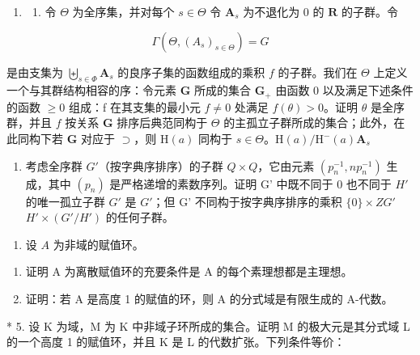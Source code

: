 \begin{enumerate}
\def\labelenumi{\arabic{enumi}.}
\setcounter{enumi}{2}
\tightlist
\item
  \begin{enumerate}
  \def\labelenumii{(\alph{enumii})}
  \tightlist
  \item
    令 \(\Theta\) 为全序集，并对每个 \(s \in \Theta\) 令 \(\mathbf{A}_s\) 为不退化为 0 的 \(\mathbf{R}\) 的子群。令
  \end{enumerate}
\end{enumerate}

\[
\Gamma (\Theta , (A _ {s}) _ {s \in \Theta}) = G
\]

是由支集为 \(\biguplus_{s\in\Phi}\mathbf{A}_{s}\) 的良序子集的函数组成的乘积 \(f\) 的子群。我们在 \(\Theta\) 上定义一个与其群结构相容的序：令元素 \(\mathbf{G}\) 所成的集合 \(\mathbf{G}_{+}\) 由函数 0 以及满足下述条件的函数 \(\geqslant0\) 组成：f 在其支集的最小元 \(f\neq0\) 处满足 \(f(\theta)>0\)。证明 \(\theta\) 是全序群，并且 \(f\) 按关系 \(\mathbf{G}\) 排序后典范同构于 \(\Theta\) 的主孤立子群所成的集合；此外，在此同构下若 \(\mathbf{G}\) 对应于 \(\supset\)，则 \(\mathrm{H}(a)\) 同构于 \(s\in\Theta\)。\(\mathrm{H}(a)/\mathrm{H}^{-}(a)\)\(\mathbf{A}_{s}\)

\begin{enumerate}
\def\labelenumi{(\alph{enumi})}
\setcounter{enumi}{1}
\tightlist
\item
  考虑全序群 \(G'\)（按字典序排序）的子群 \(Q \times Q\)，它由元素 \((p_{n}^{-1}, np_{n}^{-1})\) 生成，其中 \((p_{n})\) 是严格递增的素数序列。证明 G' 中既不同于 0 也不同于 \(H'\) 的唯一孤立子群 \(G'\) 是 \(G'\)；但 G' 不同构于按字典序排序的乘积 \(\{0\} \times Z\)\(G'\)\(H' \times (G'/H')\) 的任何子群。
\end{enumerate}

\begin{enumerate}
\def\labelenumi{\arabic{enumi}.}
\setcounter{enumi}{3}
\tightlist
\item
  设 \(A\) 为非域的赋值环。
\end{enumerate}

\begin{enumerate}
\def\labelenumi{(\alph{enumi})}
\item
  证明 A 为离散赋值环的充要条件是 A 的每个素理想都是主理想。
\item
  证明：若 A 是高度 1 的赋值的环，则 A 的分式域是有限生成的 A-代数。
\end{enumerate}

* 5. 设 K 为域，M 为 K 中非域子环所成的集合。证明 M 的极大元是其分式域 L 的一个高度 1 的赋值环，并且 K 是 L 的代数扩张。下列条件等价：

